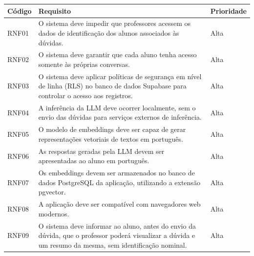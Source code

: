 \begin{quadro}[H]\captionsetup{name=Quadro}
\centering
\caption{Requisitos não funcionais}
\label{quad:requisitos-nao-funcionais}

\renewcommand{\arraystretch}{1.3}
\setlength{\tabcolsep}{4pt}

\begin{tabularx}{\textwidth}{
|>{\centering\arraybackslash}m{1.5cm}
|>{\raggedright\arraybackslash}X
|>{\centering\arraybackslash}m{2.6cm}|
}
\hline

\rowcolor[HTML]{C0C0C0}
\textbf{Código} &
\textbf{Requisito} &
\textbf{Prioridade} \\ \hline

RNF01 & O sistema deve impedir que professores acessem os dados de identificação dos alunos associados às dúvidas. & Alta \\ \hline

RNF02 & O sistema deve garantir que cada aluno tenha acesso somente às próprias conversas. & Alta \\ \hline

RNF03 & O sistema deve aplicar políticas de segurança em nível de linha (RLS) no banco de dados Supabase para controlar o acesso aos registros. & Alta \\ \hline

RNF04 & A inferência da LLM deve ocorrer localmente, sem o envio das dúvidas para serviços externos de inferência. & Alta \\ \hline

RNF05 & O modelo de embeddings deve ser capaz de gerar representações vetoriais de textos em português. & Alta \\ \hline

RNF06 & As respostas geradas pela LLM devem ser apresentadas ao aluno em português. & Alta \\ \hline

RNF07 & Os embeddings devem ser armazenados no banco de dados PostgreSQL da aplicação, utilizando a extensão pgvector. & Alta \\ \hline

RNF08 & A aplicação deve ser compatível com navegadores web modernos. & Alta \\ \hline

RNF09 & O sistema deve informar ao aluno, antes do envio da dúvida, que o professor poderá visualizar a dúvida e um resumo da mesma, sem identificação nominal. & Alta \\ \hline
\end{tabularx}
{\fontsize{10pt}{12pt}\selectfont
\caption*{Fonte: Elaborado pela autora (2026).} %
}
\end{quadro}
\FloatBarrier

